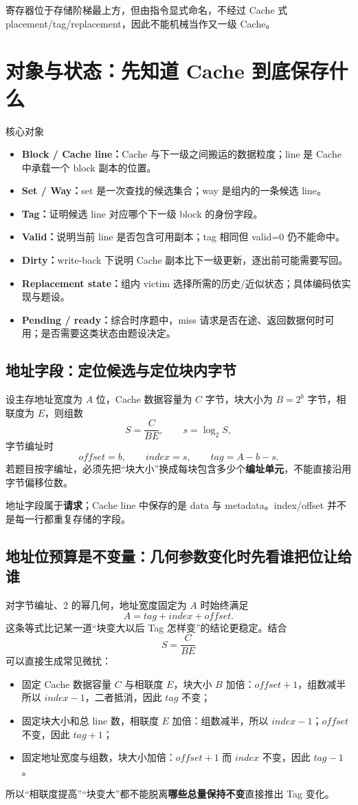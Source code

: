 \documentclass[UTF8,fontset=fandol,11pt,a4paper]{ctexart}
\newcommand{\kw}[1]{\textbf{\color{deep}#1}}\newcommand{\code}[1]{\texttt{#1}}
\begin{document}
寄存器位于存储阶梯最上方，但由指令显式命名，不经过 Cache 式 placement/tag/replacement，因此不能机械当作又一级 Cache。

\section{对象与状态：先知道 Cache 到底保存什么}
\begin{methodbox}{核心对象}
\begin{itemize}
\item \kw{Block / Cache line：}Cache 与下一级之间搬运的数据粒度；line 是 Cache 中承载一个 block 副本的位置。
\item \kw{Set / Way：}set 是一次查找的候选集合；way 是组内的一条候选 line。
\item \kw{Tag：}证明候选 line 对应哪个下一级 block 的身份字段。
\item \kw{Valid：}说明当前 line 是否包含可用副本；tag 相同但 valid=0 仍不能命中。
\item \kw{Dirty：}write-back 下说明 Cache 副本比下一级更新，逐出前可能需要写回。
\item \kw{Replacement state：}组内 victim 选择所需的历史/近似状态；具体编码依实现与题设。
\item \kw{Pending / ready：}综合时序题中，miss 请求是否在途、返回数据何时可用；是否需要这类状态由题设决定。
\end{itemize}
\end{methodbox}

\subsection{地址字段：定位候选与定位块内字节}
设主存地址宽度为 $A$ 位，Cache 数据容量为 $C$ 字节，块大小为 $B=2^b$ 字节，相联度为 $E$，则组数
\[
S=\frac{C}{B E},\qquad s=\log_2S,
\]
字节编址时
\[
offset=b,\qquad index=s,\qquad tag=A-b-s.
\]
若题目按字编址，必须先把“块大小”换成每块包含多少个\textbf{编址单元}，不能直接沿用字节偏移位数。

地址字段属于\textbf{请求}；Cache line 中保存的是 data 与 metadata。index/offset 并不是每一行都重复存储的字段。

\subsection{地址位预算是不变量：几何参数变化时先看谁把位让给谁}
对字节编址、2 的幂几何，地址宽度固定为 $A$ 时始终满足
\[
\boxed{A=tag+index+offset}.
\]
这条等式比记某一道“块变大以后 Tag 怎样变”的结论更稳定。结合
\[
S=\frac{C}{BE}
\]
可以直接生成常见微扰：
\begin{itemize}
  \item 固定 Cache 数据容量 $C$ 与相联度 $E$，块大小 $B$ 加倍：$offset+1$，组数减半所以 $index-1$，二者抵消，因此 $tag$ 不变；
  \item 固定块大小和总 line 数，相联度 $E$ 加倍：组数减半，所以 $index-1$；$offset$ 不变，因此 $tag+1$；
  \item 固定地址宽度与组数，块大小加倍：$offset+1$ 而 $index$ 不变，因此 $tag-1$。
\end{itemize}
所以“相联度提高”“块变大”都不能脱离\textbf{哪些总量保持不变}直接推出 Tag 变化。
\end{document}
